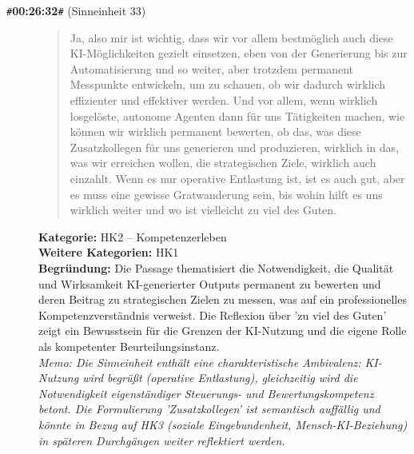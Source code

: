 \begin{description}
  \item[\texttt{\#}\textbf{00:26:32}\texttt{\#} (Sinneinheit 33)]
  \begin{quote}
  Ja, also mir ist wichtig, dass wir vor allem bestmöglich auch diese KI-Möglichkeiten gezielt einsetzen, eben von der Generierung bis zur Automatisierung und so weiter, aber trotzdem permanent Messpunkte entwickeln, um zu schauen, ob wir dadurch wirklich effizienter und effektiver werden. Und vor allem, wenn wirklich losgelöste, autonome Agenten dann für uns Tätigkeiten machen, wie können wir wirklich permanent bewerten, ob das, was diese Zusatzkollegen für uns generieren und produzieren, wirklich in das, was wir erreichen wollen, die strategischen Ziele, wirklich auch einzahlt. Wenn es nur operative Entlastung ist, ist es auch gut, aber es muss eine gewisse Gratwanderung sein, bis wohin hilft es uns wirklich weiter und wo ist vielleicht zu viel des Guten.
  \end{quote}
  \textbf{Kategorie:} HK2 -- Kompetenzerleben\\
  \textbf{Weitere Kategorien:} HK1\\
  \textbf{Begr\"undung:} Die Passage thematisiert die Notwendigkeit, die Qualität und Wirksamkeit KI-generierter Outputs permanent zu bewerten und deren Beitrag zu strategischen Zielen zu messen, was auf ein professionelles Kompetenzverständnis verweist. Die Reflexion über 'zu viel des Guten' zeigt ein Bewusstsein für die Grenzen der KI-Nutzung und die eigene Rolle als kompetenter Beurteilungsinstanz.
  \\\textit{Memo: Die Sinneinheit enthält eine charakteristische Ambivalenz: KI-Nutzung wird begrüßt (operative Entlastung), gleichzeitig wird die Notwendigkeit eigenständiger Steuerungs- und Bewertungskompetenz betont. Die Formulierung 'Zusatzkollegen' ist semantisch auffällig und könnte in Bezug auf HK3 (soziale Eingebundenheit, Mensch-KI-Beziehung) in späteren Durchgängen weiter reflektiert werden.}
\end{description}
\medskip

